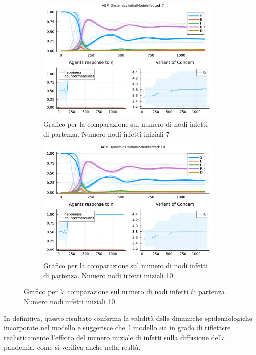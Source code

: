 \begin{figure}[!hb]
\begin{subfigure}[b]{0.45\textwidth}
		\includegraphics[width=\textwidth]{img/SocialNetworkABM_3_II.pdf}
		\caption{Grafico per la comparazione sul numero di nodi infetti di partenza. Numero nodi infetti iniziali 7}
		\label{fig:comparison_init_node_inf_7}
	\end{subfigure}
	\hfill
	\begin{subfigure}[b]{0.45\textwidth}
		\centering
		\includegraphics[width=\textwidth]{img/SocialNetworkABM_4_II.pdf}
		\caption{Grafico per la comparazione sul numero di nodi infetti di partenza. Numero nodi infetti iniziali 10}
		\label{fig:comparison_init_node_inf_10}
	\end{subfigure}
\end{figure}

In definitiva, questo risultato conferma la validità delle dinamiche 
epidemiologiche incorporate nel modello e suggerisce che il modello sia 
in grado di riflettere realisticamente l'effetto del numero iniziale di 
infetti sulla diffusione della pandemia, come si verifica anche nella 
realtà.
\newpage

